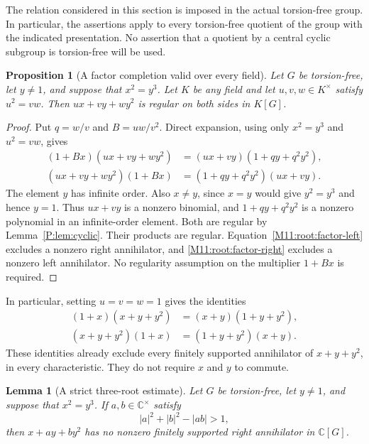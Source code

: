 \documentclass[11pt,a4paper,oneside]{report}
\newtheorem{proposition}[theorem]{Proposition}
\newtheorem{lemma}[theorem]{Lemma}
\theoremstyle{definition}
\theoremstyle{remark}
\newcommand{\C}{\mathbb C}
\begin{document}
The relation considered in this section is imposed in the actual torsion-free
group.  In particular, the assertions apply to every torsion-free quotient of
the group with the indicated presentation.  No assertion that a quotient by
a central cyclic subgroup is torsion-free will be used.

\begin{proposition}[A factor completion valid over every field]
\label{M11:root:factor}
Let $G$ be torsion-free, let $y\ne 1$, and suppose that $x^2=y^3$.
Let $K$ be any field and let $u,v,w\in K^\times$ satisfy $u^2=vw$.
Then $ux+vy+wy^2$ is regular on both sides in $K[G]$.
\end{proposition}

\begin{proof}
Put $q=w/v$ and $B=uw/v^2$.  Direct expansion, using only $x^2=y^3$
and $u^2=vw$, gives
\begin{align}
 (1+Bx)(ux+vy+wy^2)
   &=(ux+vy)(1+qy+q^2y^2),\label{M11:root:factor-left}\\
 (ux+vy+wy^2)(1+Bx)
   &=(1+qy+q^2y^2)(ux+vy).\label{M11:root:factor-right}
\end{align}
The element $y$ has infinite order.  Also $x\ne y$, since $x=y$ would
give $y^2=y^3$ and hence $y=1$.  Thus $ux+vy$ is a nonzero binomial,
and $1+qy+q^2y^2$ is a nonzero polynomial in an infinite-order element.
Both are regular by Lemma~\ref{P:lem:cyclic}.  Their products are regular.
Equation~\eqref{M11:root:factor-left} excludes a nonzero right annihilator,
and \eqref{M11:root:factor-right} excludes a nonzero left annihilator.
No regularity assumption on the multiplier $1+Bx$ is required.
\end{proof}

In particular, setting $u=v=w=1$ gives the identities
\begin{equation}
\label{M11:root:unweighted}
\begin{split}
 (1+x)(x+y+y^2)&=(x+y)(1+y+y^2),\\
 (x+y+y^2)(1+x)&=(1+y+y^2)(x+y).
\end{split}
\end{equation}
These identities already exclude every finitely supported annihilator of
$x+y+y^2$, in every characteristic.  They do not require $x$ and $y$
to commute.

\begin{lemma}[A strict three-root estimate]
\label{M11:root:arc}
Let $G$ be torsion-free, let $y\ne 1$, and suppose that $x^2=y^3$.
If $a,b\in\C^\times$ satisfy
\begin{equation}
\label{M11:root:strict}
 |a|^2+|b|^2-|ab|>1,
\end{equation}
then $x+ay+by^2$ has no nonzero finitely supported right annihilator
in $\C[G]$.
\end{lemma}
\end{document}
